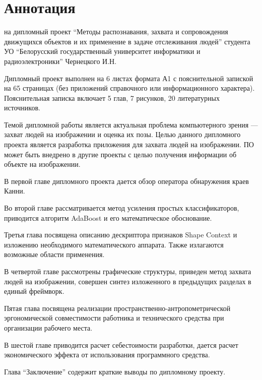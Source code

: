 \section*{Аннотация}
\thispagestyle{empty}

\begin{center}
  \begin{minipage}{0.8\textwidth}
    на дипломный проект ``Методы распознавания, захвата и сопровождения движущихся объектов и их применение в задаче отслеживания людей'' студента УО ``Белорусский государственный университет информатики и радиоэлектроники'' Чернецкого И.Н.
  \end{minipage}
\end{center}

Дипломный проект выполнен на 6 листах формата А1 с пояснительной запиской на 65 страницах (без приложений справочного или информационного характера). Пояснительная записка включает 5 глав, 7 рисунков, 20 литературных источников.

Темой дипломной работы является актуальная проблема компьютерного зрения --- захват людей на изображении и оценка их позы. Целью данного дипломного проекта является разработка приложения для захвата людей на изображении. ПО может быть внедрено в другие проекты с целью получения информации об объекте на изображении.

В первой главе дипломного проекта дается обзор оператора обнаружения краев Канни.

Во второй главе рассматривается метод усиления простых классификаторов, приводится алгоритм AdaBoost и его математическое обоснование.

Третья глава посвящена описанию дескриптора признаков Shape Context и изложению необходимого математического аппарата. Также излагаются возможные области применения.

В четвертой главе рассмотрены графические структуры, приведен метод захвата людей на изображении, совершен синтез изложенного в предыдущих разделах в единый фреймворк.

Пятая глава посвящена реализации пространственно\hyp{}антропометрической эргономической совместимости работника и технического средства при организации рабочего места.

В шестой главе приводится расчет себестоимости разработки, дается расчет экономического эффекта от использования программного средства. 

Глава ``Заключение'' содержит краткие выводы по дипломному проекту.

\newpage
